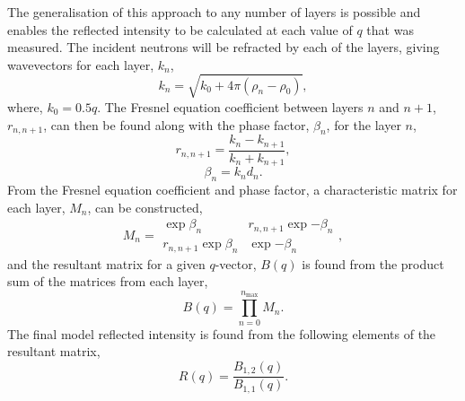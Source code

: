 \documentclass[
 reprint,
 superscriptaddress,
 amsmath,amssymb,
 aps,
]{revtex4-2}
\begin{document}
The generalisation of this approach to any number of layers is possible and enables the reflected intensity to be calculated at each value of $q$ that was measured. 
The incident neutrons will be refracted by each of the layers, giving wavevectors for each layer, $k_n$,
%
\begin{equation}
    k_n = \sqrt{k_0+4\pi(\rho_n - \rho_0)},
\end{equation}
%
where, $k_0 = 0.5q$. 
The Fresnel equation coefficient between layers $n$ and $n+1$, $r_{n, n+1}$, can then be found along with the phase factor, $\beta_n$, for the layer $n$, 
%
\begin{equation}
    r_{n, n+1} = \frac{k_n - k_{n+1}}{k_n + k_{n+1}}, 
    \label{equ:fres}
\end{equation}
%
%
\begin{equation}
    \beta_n = k_nd_n.
\end{equation}
%
From the Fresnel equation coefficient and phase factor, a characteristic matrix for each layer, $M_n$, can be constructed,
%
\begin{equation}
    M_n = 
    \begin{matrix}
        \exp{\beta_n} & r_{n,n+1}\exp{-\beta_n} \\ 
        r_{n,n+1}\exp{\beta_n} & \exp{-\beta_n}
    \end{matrix},
\end{equation}
%
and the resultant matrix for a given $q$-vector, $B(q)$ is found from the product sum of the matrices from each layer, 
%
\begin{equation}
    B(q) = \prod_{n=0}^{n_{\text{max}}}{M_n}.
\end{equation}
%
The final model reflected intensity is found from the following elements of the resultant matrix, 
%
\begin{equation}
    R(q) = \frac{B_{1,2}(q)}{B_{1,1}(q)}. 
\end{equation}
%
\end{document}
